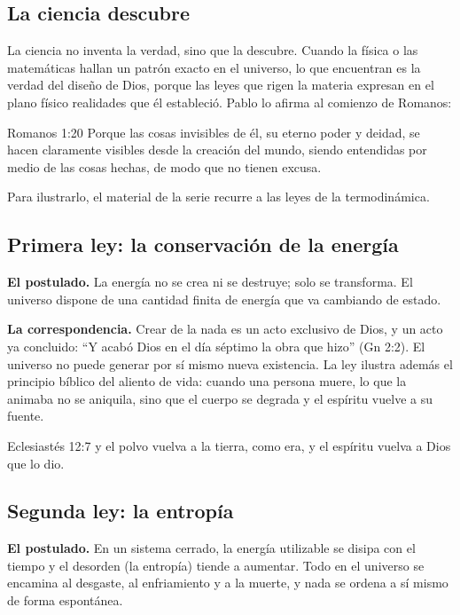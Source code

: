 \subsection{La ciencia descubre}
La ciencia no inventa la verdad, sino que la descubre. Cuando la física o las matemáticas hallan un patrón exacto en el universo, lo que encuentran es la verdad del diseño de Dios, porque las leyes que rigen la materia expresan en el plano físico realidades que él estableció. Pablo lo afirma al comienzo de Romanos:

\begin{verso}{Romanos 1:20}
Porque las cosas invisibles de él, su eterno poder y deidad, se hacen claramente visibles desde la creación del mundo, siendo entendidas por medio de las cosas hechas, de modo que no tienen excusa.
\end{verso}

Para ilustrarlo, el material de la serie recurre a las leyes de la termodinámica.

\subsection{Primera ley: la conservación de la energía}
\textbf{El postulado.} La energía no se crea ni se destruye; solo se transforma. El universo dispone de una cantidad finita de energía que va cambiando de estado.

\textbf{La correspondencia.} Crear de la nada es un acto exclusivo de Dios, y un acto ya concluido: ``Y acabó Dios en el día séptimo la obra que hizo'' (Gn 2:2). El universo no puede generar por sí mismo nueva existencia. La ley ilustra además el principio bíblico del aliento de vida: cuando una persona muere, lo que la animaba no se aniquila, sino que el cuerpo se degrada y el espíritu vuelve a su fuente.

\begin{verso}{Eclesiastés 12:7}
y el polvo vuelva a la tierra, como era, y el espíritu vuelva a Dios que lo dio.
\end{verso}


\subsection{Segunda ley: la entropía}
\textbf{El postulado.} En un sistema cerrado, la energía utilizable se disipa con el tiempo y el desorden (la entropía) tiende a aumentar. Todo en el universo se encamina al desgaste, al enfriamiento y a la muerte, y nada se ordena a sí mismo de forma espontánea.


